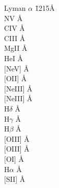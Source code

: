 \begin{tabbing}

Lyman $\alpha$  \hspace*{2cm} \=  1215\AA \\

NV          \AA \\

CIV         \AA \\

CIII        \AA \\

MgII        \AA \\

HeI         \AA  \\ 

[NeV]        \AA  \\

[OII]     \AA \\

[NeIII]    \AA \\

[NeIII]    \AA \\

H$\delta$ \AA \\

H$\gamma$ \AA \\

H$\beta$    \AA \\

[OIII]    \AA \\

[OIII]    \AA \\

[OI]      \AA \\

H$\alpha$   \AA \\

[SII]     \AA \\


\end{tabbing}
